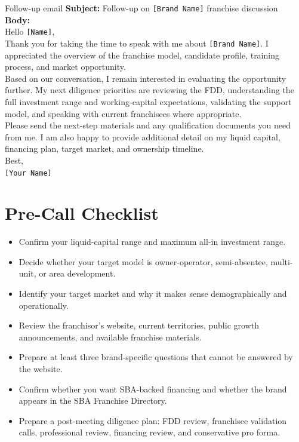\documentclass[11pt]{article}
\newcommand{\placeholder}[1]{\textcolor{accent}{\texttt{[#1]}}}
\begin{document}
\begin{scriptbox}{Follow-up email}
\textbf{Subject:} Follow-up on \placeholder{Brand Name} franchise discussion\\[0.4em]
\textbf{Body:}\\
Hello \placeholder{Name},\\[0.25em]
Thank you for taking the time to speak with me about \placeholder{Brand Name}. I appreciated the overview of the franchise model, candidate profile, training process, and market opportunity.\\[0.25em]
Based on our conversation, I remain interested in evaluating the opportunity further. My next diligence priorities are reviewing the FDD, understanding the full investment range and working-capital expectations, validating the support model, and speaking with current franchisees where appropriate.\\[0.25em]
Please send the next-step materials and any qualification documents you need from me. I am also happy to provide additional detail on my liquid capital, financing plan, target market, and ownership timeline.\\[0.25em]
Best,\\
\placeholder{Your Name}
\end{scriptbox}

\section{Pre-Call Checklist}

\begin{itemize}
  \item Confirm your liquid-capital range and maximum all-in investment range.
  \item Decide whether your target model is owner-operator, semi-absentee, multi-unit, or area development.
  \item Identify your target market and why it makes sense demographically and operationally.
  \item Review the franchisor's website, current territories, public growth announcements, and available franchise materials.
  \item Prepare at least three brand-specific questions that cannot be answered by the website.
  \item Confirm whether you want SBA-backed financing and whether the brand appears in the SBA Franchise Directory.
  \item Prepare a post-meeting diligence plan: FDD review, franchisee validation calls, professional review, financing review, and conservative pro forma.
\end{itemize}
\end{document}
